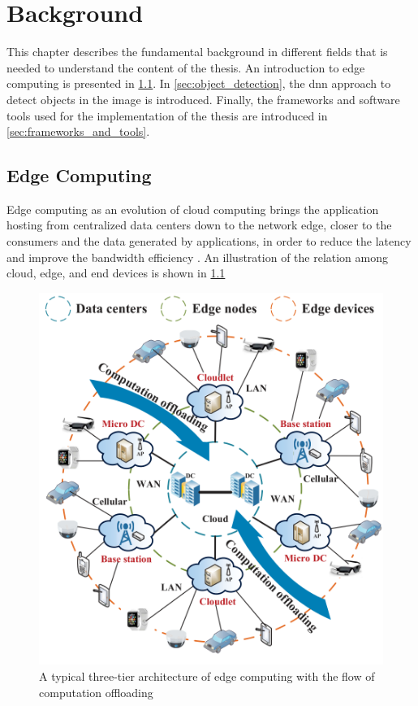 \chapter{Background}\label{ch:background}

This chapter describes the fundamental background in different fields that is needed to understand the content of the thesis. An introduction to edge computing is presented in \cref{sec:edge_computing}. In \cref{sec:object_detection}, the \gls{dnn} approach to detect objects in the image is introduced. Finally, the frameworks and software tools used for the implementation of the thesis are introduced in \cref{sec:frameworks_and_tools}.

\section{Edge Computing}\label{sec:edge_computing}

Edge computing as an evolution of cloud computing brings the application hosting from centralized data centers down to the network edge, closer to the consumers and the data generated by applications, in order to reduce the latency and improve the bandwidth efficiency \cite{Kekki2018}. An illustration of the relation among cloud, edge, and end devices is shown in \cref{fig:mec}

\begin{figure}
    \centering
    \includegraphics[width=0.6\linewidth]{figures/background/mec.png}
    \caption[A typical three-tier architecture of edge computing with the flow of computation offloading]{A typical three-tier architecture of edge computing with the flow of computation offloading \cite{Lin2019}}
    \label{fig:mec}
\end{figure}

